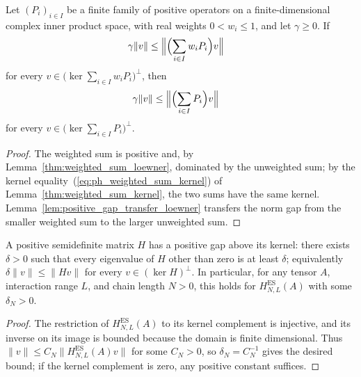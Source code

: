 \begin{lemma}
    \label{thm:weighted_sum_gap_transfer}
    Let $(P_i)_{i\in I}$ be a finite family of positive operators on a
    finite-dimensional complex inner product space, with real weights
    $0<w_i\leq1$, and let $\gamma\geq0$.  If
    \begin{align}
        \gamma\lVert v\rVert
         & \leq\Bigl\lVert\Bigl(\sum_{i\in I}w_iP_i\Bigr)v\Bigr\rVert
    \end{align}
    for every $v\in\bigl(\ker\sum_{i\in I}w_iP_i\bigr)^\perp$, then
    \begin{align}
        \gamma\lVert v\rVert
         & \leq\Bigl\lVert\Bigl(\sum_{i\in I}P_i\Bigr)v\Bigr\rVert
    \end{align}
    for every $v\in\bigl(\ker\sum_{i\in I}P_i\bigr)^\perp$.
\end{lemma}

\begin{proof}
    The weighted sum is positive and, by
    Lemma~\ref{thm:weighted_sum_loewner}, dominated by the unweighted
    sum; by the kernel equality~(\ref{eq:ph_weighted_sum_kernel}) of
    Lemma~\ref{thm:weighted_sum_kernel}, the two sums have the same
    kernel.  Lemma~\ref{lem:positive_gap_transfer_loewner} transfers the
    norm gap from the smaller weighted sum to the larger unweighted sum.
\end{proof}

\begin{lemma}
    \label{thm:parent_hamiltonian_fixed_length_gap}
    \leanok
    A positive semidefinite matrix $H$ has a positive gap above its kernel:
    there exists $\delta>0$ such that every eigenvalue of $H$ other than zero
    is at least $\delta$; equivalently
    $\delta\lVert v\rVert\leq\lVert Hv\rVert$ for every $v\in(\ker H)^\perp$.
    In particular, for any tensor $A$, interaction range $L$, and chain length
    $N>0$, this holds for $H_{N,L}^{\mathrm{ES}}(A)$ with some $\delta_N>0$.
\end{lemma}

\begin{proof}
    \leanok
    The restriction of $H_{N,L}^{\mathrm{ES}}(A)$ to its kernel complement
    is injective, and its inverse on its image is bounded because the domain is
    finite dimensional. Thus $\lVert v\rVert\leq C_N\lVert
        H_{N,L}^{\mathrm{ES}}(A)v\rVert$ for some $C_N>0$, so
    $\delta_N=C_N^{-1}$ gives the desired bound; if the kernel complement is
    zero, any positive constant suffices.
\end{proof}

